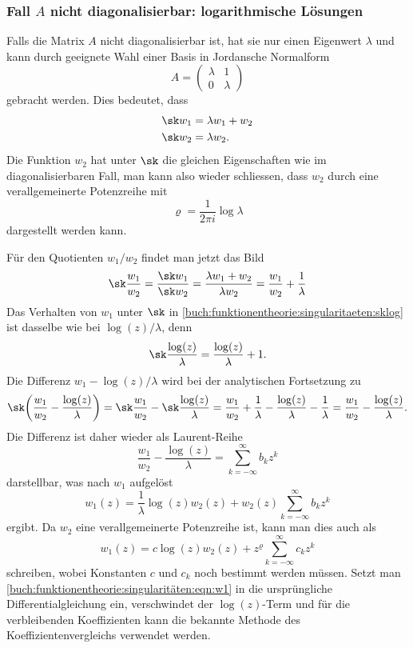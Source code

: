 \subsubsection{Fall $A$ nicht diagonalisierbar: logarithmische Lösungen}
Falls die Matrix $A$ nicht diagonalisierbar ist, hat sie nur einen
Eigenwert $\lambda$ und kann durch geeignete Wahl einer Basis in
Jordansche Normalform
\[
A
=
\begin{pmatrix}
\lambda &    1    \\
   0    & \lambda
\end{pmatrix}
\]
gebracht werden.
Dies bedeutet, dass
\begin{align*}
\sk w_1 &= \lambda w_1 + w_2
\\
\sk w_2 &= \lambda w_2.
\end{align*}
Die Funktion $w_2$ hat unter $\sk$ die gleichen Eigenschaften
wie im diagonalisierbaren Fall, man kann also wieder schliessen,
dass $w_2$ durch eine verallgemeinerte Potenzreihe mit
\[
\varrho=\frac{1}{2\pi i} \log \lambda
\]
dargestellt werden kann.

Für den Quotienten $w_1/w_2$ findet man jetzt das Bild
\begin{equation}
\sk \frac{w_1}{w_2}
=
\frac{\sk w_1}{\sk w_2}
=
\frac{\lambda w_1+w_2}{\lambda w_2}
=
\frac{w_1}{w_2} + \frac{1}{\lambda}
\label{buch:funktionentheorie:singularitaeten:sklog}
\end{equation}
Das Verhalten von $w_1$ unter $\sk$ in
\eqref{buch:funktionentheorie:singularitaeten:sklog}
ist dasselbe wie bei $\log(z)/\lambda$, denn
\[
\sk \frac{\log(z)}{\lambda}
=
\frac{\log(z)}{\lambda} + 1.
\]
Die Differenz $w_1-\log(z)/\lambda$ wird bei der analytischen
Fortsetzung zu
\[
\sk\biggl(
\frac{w_1}{w_2}-\frac{\log(z)}{\lambda}
\biggr)
=
\sk \frac{w_1}{w_2} - \sk\frac{\log(z)}{\lambda}
=
\frac{w_1}{w_2} + \frac{1}{\lambda}
-
\frac{\log(z)}{\lambda}
-\frac{1}{\lambda}
=
\frac{w_1}{w_2}-\frac{\log(z)}{\lambda}.
\]
Die Differenz ist daher wieder als Laurent-Reihe
\[
\frac{w_1}{w_2}-\frac{\log(z)}{\lambda}
=
\sum_{k=-\infty}^\infty b_kz^k
\]
darstellbar, was nach $w_1$ aufgelöst 
\[
w_1(z)
=
\frac{1}{\lambda} \log(z) w_2(z)
+
w_2(z) \sum_{k=-\infty}^\infty b_kz^k
\]
ergibt.
Da $w_2$ eine verallgemeinerte Potenzreihe ist, kann man dies auch
als
\begin{equation}
w_1(z)
=
c \log(z) w_2(z)
+
z^{\varrho}
\sum_{k=-\infty}^{\infty} c_kz^k
\label{buch:funktionentheorie:singularitäten:eqn:w1}
\end{equation}
schreiben, wobei Konstanten $c$ und $c_k$ noch bestimmt werden müssen.
Setzt man
\eqref{buch:funktionentheorie:singularitäten:eqn:w1}
in die ursprüngliche Differentialgleichung ein, verschwindet der
$\log(z)$-Term und für die verbleibenden Koeffizienten kann die
bekannte Methode des Koeffizientenvergleichs verwendet werden.

